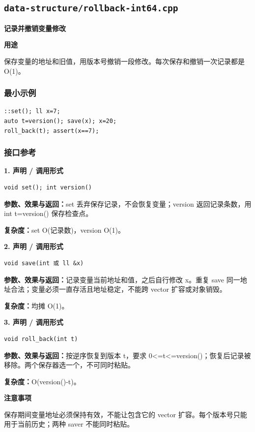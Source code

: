\documentclass[UTF8,a4paper,10pt]{ctexart}
\newcommand{\TemplUsage}[1]{\textbf{用途}\par #1\par}
\newcommand{\TemplNote}[1]{\textbf{注意事项}\par #1\par}
\begin{document}
\subsection{\texttt{data-structure/rollback-int64.cpp}}
\textbf{记录并撤销变量修改}\par
\TemplUsage{保存变量的地址和旧值，用版本号撤销一段修改。每次保存和撤销一次记录都是 O(1)。}
\subsubsection*{最小示例}
\begin{lstlisting}
::set(); ll x=7;
auto t=version(); save(x); x=20;
roll_back(t); assert(x==7);
\end{lstlisting}
\subsubsection*{接口参考}
\noindent\begin{minipage}{\textwidth}
\textbf{1. 声明 / 调用形式}
\begin{lstlisting}
void set(); int version()
\end{lstlisting}
\textbf{参数、效果与返回：}set 丢弃保存记录，不会恢复变量；version 返回记录条数，用 int t=version() 保存检查点。

\textbf{复杂度：}set O(记录数)，version O(1)。

\end{minipage}\par\vspace{0.4em}
\noindent\begin{minipage}{\textwidth}
\textbf{2. 声明 / 调用形式}
\begin{lstlisting}
void save(int 或 ll &x)
\end{lstlisting}
\textbf{参数、效果与返回：}记录变量当前地址和值，之后自行修改 x。重复 save 同一地址合法；变量必须一直存活且地址稳定，不能跨 vector 扩容或对象销毁。

\textbf{复杂度：}均摊 O(1)。

\end{minipage}\par\vspace{0.4em}
\noindent\begin{minipage}{\textwidth}
\textbf{3. 声明 / 调用形式}
\begin{lstlisting}
void roll_back(int t)
\end{lstlisting}
\textbf{参数、效果与返回：}按逆序恢复到版本 t，要求 0<=t<=version()；恢复后记录被移除。两个保存器选一个，不可同时粘贴。

\textbf{复杂度：}O(version()-t)。

\TemplNote{保存期间变量地址必须保持有效，不能让包含它的 vector 扩容。每个版本号只能用于当前历史；两种 saver 不能同时粘贴。}
\end{minipage}\par\vspace{0.4em}
\clearpage
\end{document}
